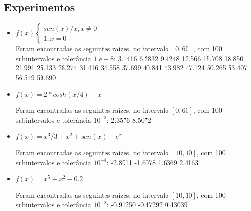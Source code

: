 \documentclass{article}
\begin{document}
\subsection{Experimentos}
\begin{itemize}
\item 
	$f(x) \left\{
	\begin{array}{ll}
	sen(x) / x, x \neq 0\\
	1, x = 0
	\end{array}\right.$\\
	
	Foram encontradas as seguintes raízes, no intervalo $[0, 60]$, com 100 subintervalos e tolerância $1.e-8$:
	 3.1416
	 6.2832
	 9.4248
	 12.566
	 15.708
	 18.850
	 21.991
	 25.133
	 28.274
	 31.416
	 34.558
	 37.699
	 40.841
	 43.982
	 47.124
	 50.265
	 53.407
	 56.549
	 59.690
	 
\item
	$f(x) = 2 * cosh (x/4) - x$
	
	Foram encontradas as seguintes raízes, no intervalo $[0, 60]$, com 100 subintervalos e tolerância $10^{-8}$:
	2.3576                                                                                                     	8.5072 
	
\item	
	$f(x) = x^{3} / 3 + x^{2} + sen(x) - e ^{x}$
	
	Foram encontradas as seguintes raízes, no intervalo $[10, 10]$, com 100 subintervalos e tolerância $10^{-8}$:
-2.8911                                                                                                           -1.6078                                                                                                           
1.6369
2.4163

\item	
$f(x) = x ^{5} + x ^{2} - 0.2$

Foram encontradas as seguintes raízes, no intervalo $[10, 10]$, com 100 subintervalos e tolerância $10^{-8}$:
-0.91250
-0.47292
0.43039

\end{itemize}
\end{document}
